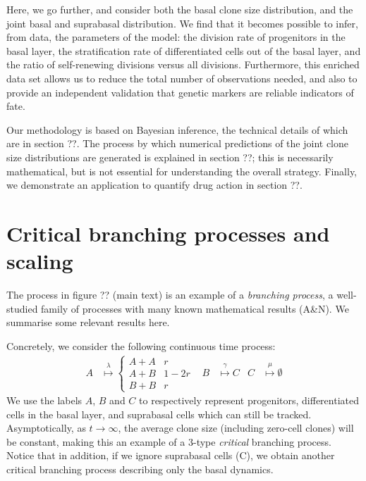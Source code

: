 \documentclass[10pt,UKenglish]{article}
\begin{document}
Here, we go further, and consider both the basal clone size distribution, and
the joint basal and suprabasal distribution. We find that it becomes possible to
infer, from data, the parameters of the model: the division rate of progenitors
in the basal layer, the stratification rate of differentiated cells out of the
basal layer, and the ratio of self-renewing divisions versus all divisions.
Furthermore, this enriched data set allows us to reduce the total number of
observations needed, and also to provide an independent validation that genetic
markers are reliable indicators of fate. 

Our methodology is based on Bayesian inference, the technical details of which
are in section ??. The process by which numerical predictions of the joint clone
size distributions are generated is explained in section ??; this is necessarily
mathematical, but is not essential for understanding the overall strategy.
Finally, we demonstrate an application to quantify drug action in section ??.

\section{Critical branching processes and scaling}

The process in figure ?? (main text) is an example of a \emph{branching process}, a well-studied family of processes with many known mathematical results (A\&N). We summarise some relevant results here.

Concretely, we consider the following continuous time process:
\begin{align}
A &\overset{\lambda}{\longmapsto} \begin{cases}
A+A & r \\
A+B & 1-2r \\
B+B & r\end{cases} & B &\overset{\gamma}{\longmapsto} C & C &\overset{\mu}{\longmapsto} \emptyset
\label{eq:really-full-model}
\end{align}
We use the labels $A$, $B$ and $C$ to respectively represent progenitors,
differentiated cells in the basal layer, and suprabasal cells which can still be
tracked. Asymptotically, as $t \rightarrow \infty$, the average clone size
(including zero-cell clones) will be constant, making this an example of a
3-type \emph{critical} branching process. Notice that in addition, if we ignore
suprabasal cells (C), we obtain another critical branching process describing
only the basal dynamics.
\end{document}

